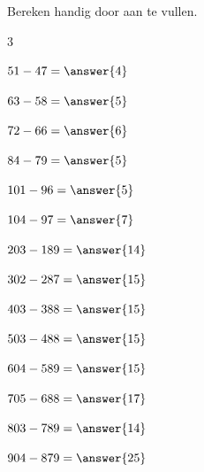 \documentclass{ximera}
\begin{document}
\begin{oefening}{\oefB}

Bereken handig door aan te vullen.

\begin{multicols}{3}

\begin{question} \(51-47=\answer{4}\) \end{question}

\begin{question} \(63-58=\answer{5}\) \end{question}

\begin{question} \(72-66=\answer{6}\) \end{question}

\begin{question} \(84-79=\answer{5}\) \end{question}

\begin{question} \(101-96=\answer{5}\) \end{question}

\begin{question} \(104-97=\answer{7}\) \end{question}

\begin{question} \(203-189=\answer{14}\) \end{question}

\begin{question} \(302-287=\answer{15}\) \end{question}

\begin{question} \(403-388=\answer{15}\) \end{question}

\begin{question} \(503-488=\answer{15}\) \end{question}

\begin{question} \(604-589=\answer{15}\) \end{question}

\begin{question} \(705-688=\answer{17}\) \end{question}

\begin{question} \(803-789=\answer{14}\) \end{question}

\begin{question} \(904-879=\answer{25}\) \end{question}


\end{multicols}
\end{oefening}
\end{document}
